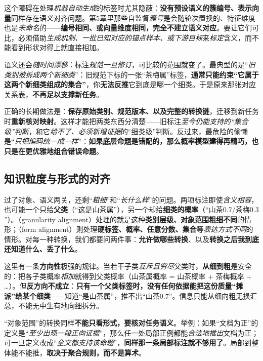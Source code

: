 这个障碍在处理\emph{机器自动生成}的标签时尤其隐蔽：\textbf{没有预设语义的簇编号、表示向量}同样存在语义对齐问题。第5章里那些自监督\emph{簇号}是会随轮次置换的、特征维度也是\emph{未命名}的——\textbf{编号相同、或向量维度相同，完全不建立语义对应}。要让它们可比，必须借助\emph{生成机制、一批已知对应的锚点样本、或下游目标}来\emph{标定}含义，而不能看到形状对得上就直接相加。

语义还会\emph{随时间漂移}：标注\emph{规范一旦修订}，可比较的范围就变了。最典型的是“\emph{旧类别被拆成两个新细类}”：旧规范下标的一张“茶梅属”标签，\textbf{通常只能约束“它属于这两个新细类组成的集合”}，你\textbf{无法反推}它到底是哪一个细类。于是原来那张对应关系表，\textbf{不再足以支撑新任务}。

正确的长期做法是：\textbf{保存原始类别、规范版本、以及完整的转换链}，迁移到新任务时\textbf{重新核对映射}。这样才能把两类东西分清楚——旧标注\emph{至今仍能支持的“集合级”判断}，和它\emph{给不了、必须新增证据}的“细类级”判断。反过来，最危险的偷懒是“\emph{只把编码统一成一样}”：\textbf{如果底层命题是错配的，那么概率模型建得再精巧，也只是在更优雅地组合错误命题}。

\subsection{知识粒度与形式的对齐}
\label{sec:knowledge-fusion-granularity-form-alignment}

过了对象、语义两关，还剩“\emph{粗细}”和“\emph{长什么样}”的问题。两项标注即使\emph{含义相容}，也可能一个只给\textbf{父类}（“这是山茶属”），另一个却给\textbf{细类的概率}（“山茶$0.7$/茶梅$0.3$”）。（granularity alignment）处理的就是这种\textbf{类别层级、对象范围粗细不同}的情形；（form alignment）则处理\textbf{硬标签、概率、任意分数、集合}等\emph{表达方式不同}的情形。对每一种转换，我们都要问两件事：\textbf{允许做哪些转换}、以及\textbf{转换之后我到底还知道什么、丢了什么}。

这里有一条\textbf{方向性}极强的规律。当若干子类\emph{互斥且穷尽}父类时，\textbf{从细到粗}是安全的：把各子类概率\emph{相加}就得到父类概率（山茶属概率 = 山茶概率 + 茶梅概率 + …）。但\textbf{反方向不成立}：\textbf{只有一个父类标签时，没有任何依据能把这份质量“摊派”给某个细类}——知道“是山茶属”，推不出“山茶$0.7$”。信息只能从细向粗无损汇总，不能无中生有地向细拆分。

“对象范围”的转换同样\textbf{不能只看形式，要核对任务语义}。举例：如果“文档为正”的定义是“\emph{至少出现一段正向证据}”，那么任一处局部正例都能\emph{合法地推出}文档为正；可一旦定义改成“\emph{全文都支持该命题}”，\textbf{同样那一条局部标注就不够用了}。局部到整体能不能推，\textbf{取决于聚合规则，而不是算术}。

